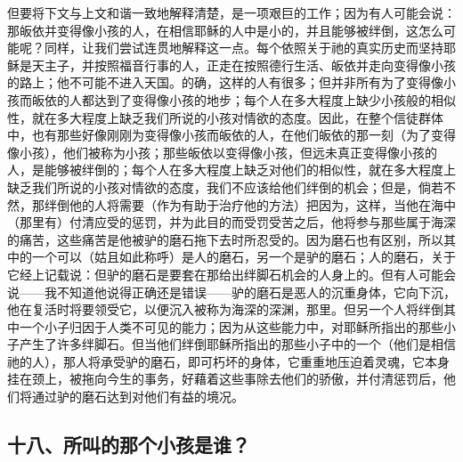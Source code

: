 但要将下文与上文和谐一致地解释清楚，是一项艰巨的工作；因为有人可能会说：那皈依并变得像小孩的人，在相信耶稣的人中是小的，并且能够被绊倒，这怎么可能呢？同样，让我们尝试连贯地解释这一点。每个依照关于祂的真实历史而坚持耶稣是天主子，并按照福音行事的人，正走在按照德行生活、皈依并走向变得像小孩的路上；他不可能不进入天国。的确，这样的人有很多；但并非所有为了变得像小孩而皈依的人都达到了变得像小孩的地步；每个人在多大程度上缺少小孩般的相似性，就在多大程度上缺乏我们所说的小孩对情欲的态度。因此，在整个信徒群体中，也有那些好像刚刚为变得像小孩而皈依的人，在他们皈依的那一刻（为了变得像小孩），他们被称为小孩；那些皈依以变得像小孩，但远未真正变得像小孩的人，是能够被绊倒的；每个人在多大程度上缺乏对他们的相似性，就在多大程度上缺乏我们所说的小孩对情欲的态度，我们不应该给他们绊倒的机会；但是，倘若不然，那绊倒他的人将需要（作为有助于治疗他的方法）把因为，这样，当他在海中（那里有）付清应受的惩罚，并为此目的而受罚受苦之后，他将参与那些属于海深的痛苦，这些痛苦是他被驴的磨石拖下去时所忍受的。因为磨石也有区别，所以其中的一个可以（姑且如此称呼）是人的磨石，另一个是驴的磨石；人的磨石，关于它经上记载说：但驴的磨石是要套在那给出绊脚石机会的人身上的。但有人可能会说——我不知道他说得正确还是错误——驴的磨石是恶人的沉重身体，它向下沉，他在复活时将要领受它，以便沉入被称为海深的深渊，那里。但另一个人将绊倒其中一个小子归因于人类不可见的能力；因为从这些能力中，对耶稣所指出的那些小子产生了许多绊脚石。但当他们绊倒耶稣所指出的那些小子中的一个（他们是相信祂的人），那人将承受驴的磨石，即可朽坏的身体，它重重地压迫着灵魂，它本身挂在颈上，被拖向今生的事务，好藉着这些事除去他们的骄傲，并付清惩罚后，他们将通过驴的磨石达到对他们有益的境况。\par


\subsection{十八、所叫的那个小孩是谁？}


